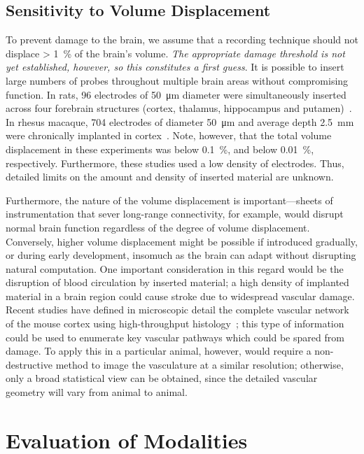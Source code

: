 \subsection{Sensitivity to Volume Displacement}

To prevent damage to the brain, we assume that a recording technique should not displace \SI{> 1}{\percent} of the brain's volume. \emph{The appropriate damage threshold is not yet established, however, so this constitutes a first guess}. It is possible to insert large numbers of probes throughout multiple brain areas without compromising function. In rats, 96 electrodes of \SI{50}{\micro\meter} diameter were simultaneously inserted across four forebrain structures (cortex, thalamus, hippocampus and putamen)~\cite{Ribeiro2004}. In rhesus macaque, 704 electrodes of diameter \SI{50}{\micro\meter} and average depth \SI{2.5}{\milli\meter} were chronically implanted in cortex~\cite{Nicolelis2003}. Note, however, that the total volume displacement in these experiments was below \SI{0.1}{\percent}, and below \SI{0.01}{\percent}, respectively.  Furthermore, these studies used a low density of electrodes. Thus, detailed limits on the amount and density of inserted material are unknown.

Furthermore, the nature of the volume displacement is important---sheets of instrumentation that sever long-range connectivity, for example, would disrupt normal brain function regardless of the degree of volume displacement.
Conversely, higher volume displacement might be possible if introduced gradually, or during early development, insomuch as the brain can adapt without disrupting natural computation. One important consideration in this regard would be the disruption of blood circulation by inserted material; a high density of implanted material in a brain region could cause stroke due to widespread vascular damage. Recent studies have defined in microscopic detail the complete vascular network of the mouse cortex using high-throughput histology~\cite{Kleinfeld2013}; this type of information could be used to enumerate key vascular pathways which could be spared from damage. To apply this in a particular animal, however, would require a non-destructive method to image the vasculature at a similar resolution; otherwise, only a broad statistical view can be obtained, since the detailed vascular geometry will vary from animal to animal.

\section{Evaluation of Modalities}

